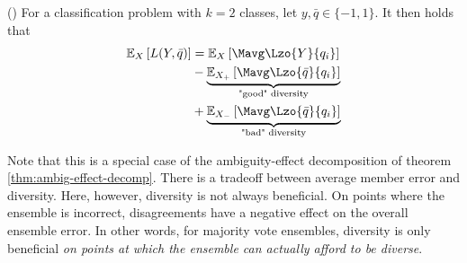 \documentclass[../main.tex]{subfiles}
\begin{document}
\begin{corollary} (\cite{brown_GoodBadDiversity_2010})
    \label{thm:good-bad-diversity}
For a classification problem with $k=2$ classes, let $y, \bar{q} \in \{ -1, 1 \}$. It then holds that
\begin{align*}
\mathbb{E}_{X}\left[   L(Y, \bar{q}) \right] 
&= 
\mathbb{E}_{X}\left[    \Mavg \Lzo{Y}{q_{i}}  \right] \\
&- 
\underbrace{
\mathbb{E}_{X_{+}}\left[ \Mavg \Lzo{\bar{q}}{q_{i}} \right]  
}_{\text{"good" diversity}} \\
&+ 
\underbrace{
\mathbb{E}_{X_{-}}\left[ \Mavg \Lzo{\bar{q}}{q_{i}} \right] 
}_{\text{"bad" diversity}}
\end{align*}
\end{corollary}


Note that this is a special case of the ambiguity-effect decomposition of theorem \ref{thm:ambig-effect-decomp}.
There is a tradeoff between average member error and diversity. Here, however, diversity is not always beneficial. On points where the ensemble is incorrect, disagreements have a negative effect on the overall ensemble error.
In other words, for majority vote ensembles, diversity is only beneficial \textit{on points at which the ensemble can actually afford to be diverse}. 
\end{document}
